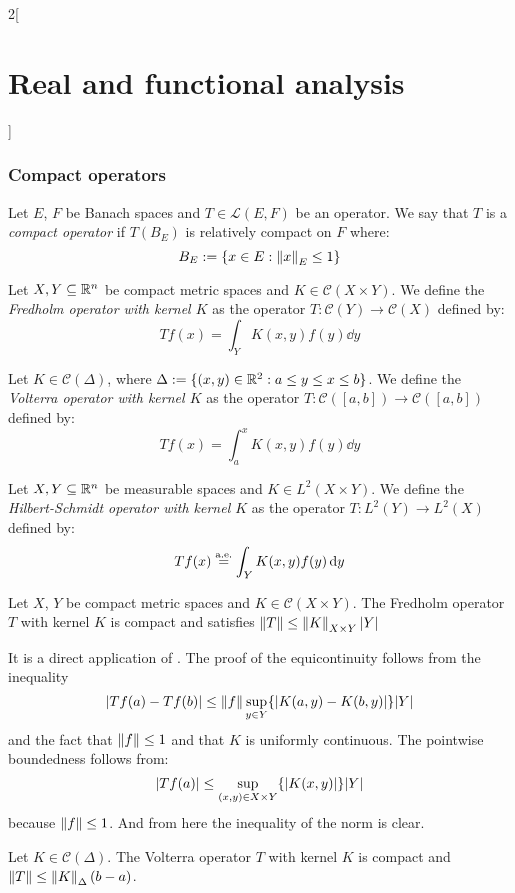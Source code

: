 \documentclass[../../../main_math.tex]{subfiles}
\begin{document}
\begin{multicols}{2}[\section{Real and functional analysis}]
  \subsubsection{Compact operators}
  \begin{definition}
    Let $E$, $F$ be Banach spaces and $T\in\mathcal{L}(E,F)$ be an operator. We say that $T$ is a \emph{compact operator} if $T(B_E)$ is relatively compact on $F$ where: $$B_E:=\{x\in E:\left\|x\right\|_E\leq 1\}$$
  \end{definition}
  \begin{definition}
    Let $X,Y\subseteq \mathbb{R}^n$ be compact metric spaces and $K\in\mathcal{C}(X\times Y)$. We define the \emph{Fredholm operator with kernel $K$} as the operator $T:\mathcal{C}(Y)\rightarrow\mathcal{C}(X)$ defined by: $$Tf(x)=\int_YK(x,y)f(y)\dd{y}$$
  \end{definition}
  \begin{definition}
    Let $K\in\mathcal{C}(\Delta)$, where $\Delta:=\{(x,y)\in\mathbb{R}^2:a\leq y\leq x\leq b\}$. We define the \emph{Volterra operator with kernel $K$} as the operator $T:\mathcal{C}([a,b])\rightarrow\mathcal{C}([a,b])$ defined by: $$Tf(x)=\int_a^xK(x,y)f(y)\dd{y}$$
  \end{definition}
  \begin{definition}
    Let $X,Y\subseteq \mathbb{R}^n$ be measurable spaces and $K\in L^2(X\times Y)$. We define the \emph{Hilbert-Schmidt operator with kernel $K$} as the operator $T:L^2(Y)\rightarrow L^2(X)$ defined by: $$Tf(x)\overset{\text{a.e.}}{=}\int_YK(x,y)f(y)\dd{y}$$
  \end{definition}
  \begin{proposition}\label{RFA:fredholm}
    Let $X$, $Y$ be compact metric spaces and $K\in\mathcal{C}(X\times Y)$. The Fredholm operator $T$ with kernel $K$ is compact and satisfies $\norm{T}\leq\norm{K}_{X\times Y}\m{Y}$
  \end{proposition}
  \begin{sproof}
    It is a direct application of . The proof of the equicontinuity follows from the inequality
    $$\abs{Tf(a)-Tf(b)}\leq \norm{f}\sup_{y\in Y}\{\abs{K(a,y)-K(b,y)}\}\m{Y}$$
    and the fact that $\left\|f\right\|\leq 1$ and that $K$ is uniformly continuous. The pointwise boundedness follows from:
    $$\abs{Tf(a)}\leq\sup_{(x,y)\in X\times Y}\{\abs{K(x,y)}\}\m{Y}$$
    because $\left\|f\right\|\leq 1$.
    And from here the inequality of the norm is clear.
  \end{sproof}
  \begin{proposition}
    Let $K\in\mathcal{C}(\Delta)$. The Volterra operator $T$ with kernel $K$ is compact and $\left\|T\right\|\leq\left\|K\right\|_{\Delta}(b-a)$.

\end{proposition}
\end{multicols}
\end{document}
